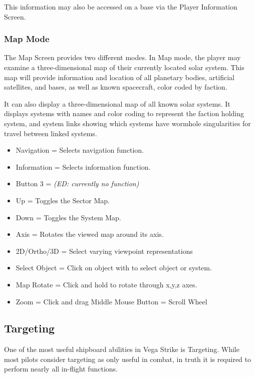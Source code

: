 \documentclass{article}
\newcommand{\key}[1]{%
  \tikz[baseline=(key.base)]{
    \node[draw=gray!50, fill=gray!5, rounded corners=2pt, inner sep=2pt, minimum height=1.5ex] (key) {\footnotesize\sffamily\bfseries #1};
  }%
}
\begin{document}
This information may also be accessed on a base via the Player Information Screen. 


\subsubsection{Map Mode }

The Map Screen provides two different modes. In Map mode, the player may examine a three-dimensional map of their currently located solar system. This map will provide information and location of all planetary bodies, artificial satellites, and bases, as well as known spacecraft, color coded by faction. 


It can also display a three-dimensional map of all known solar systems. It displays systems with names and color coding to represent the faction holding system, and system links showing which systems have wormhole singularities for travel between linked systems. 

\begin{itemize}
\item  Navigation = Selects navigation function. 
\item  Information = Selects information function. 
\item  Button 3 = \textit{(ED: currently no function)}
\item  Up = Toggles the Sector Map. 
\item  Down = Toggles the System Map. 
\item  Axis = Rotates the viewed map around its axis. 
\item  2D/Ortho/3D = Select varying viewpoint representations
\item  Select Object = Click on object with \key{LMB} to select object or system. 
\item  Map Rotate = Click \key{LMB} and hold to rotate through x,y,z axes. 
\item  Zoom = Click and drag Middle Mouse Button = Scroll Wheel 
\end{itemize}

\subsection{ Targeting }

One of the most useful shipboard abilities in Vega Strike is Targeting. While most pilots consider targeting as only useful in combat, in truth it is required to perform nearly all in-flight functions. 
\end{document}
